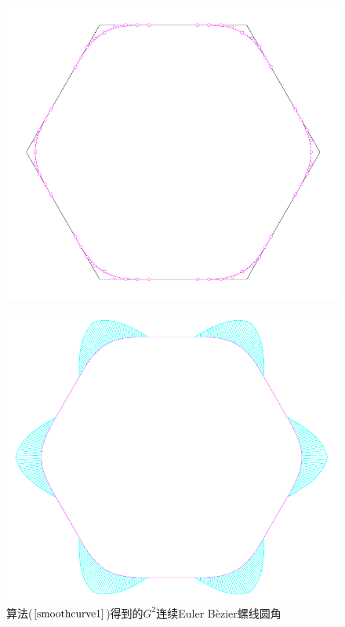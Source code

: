 \documentclass[utf8]{ctexart} %
\begin{document}
		 \begin{figure}[htbp]
		 	\centering
		 	\begin{minipage}{0.49\linewidth}{\label{EB_figure}}
		 		\centering
		 		\includegraphics[width=0.9\linewidth]{figures/SmoothCorner1.png}
		 	\end{minipage}
		 	\begin{minipage}{0.49\linewidth}
		 		\centering
		 		\includegraphics[width=0.9\linewidth]{figures/SmoothCorner2.png}
		 	\end{minipage}
		 	\caption{算法($\ref{smoothcurve1}$)得到的$G^2$连续Euler B\`{e}zier螺线圆角}
		 \end{figure}
\end{document}
